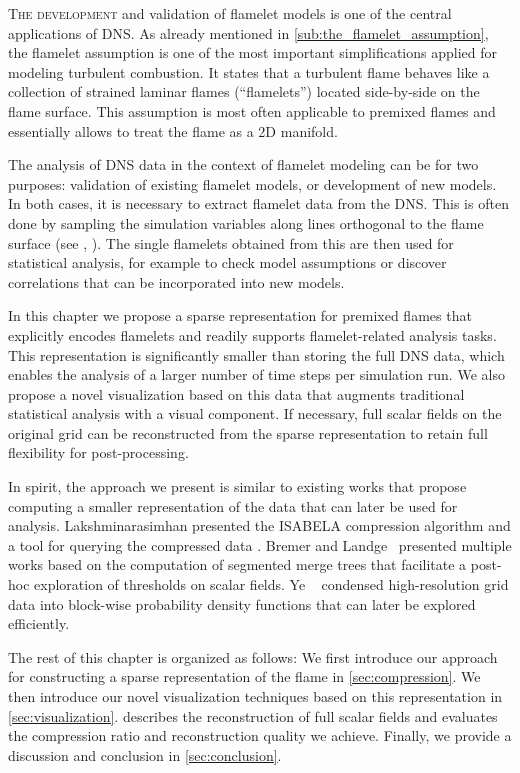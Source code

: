 \lettrine[lines=3, loversize=0.02, lhang=0.03, findent=-0.7pt,
nindent=0pt]{T}{he development} and validation of flamelet models is one of the
central applications of
\ac{DNS}.
%
As already mentioned in \cref{sub:the_flamelet_assumption}, the flamelet
assumption is one of the most important simplifications applied for modeling
turbulent combustion.
%
It states that a turbulent flame behaves like a collection of strained laminar
flames (``flamelets'') located side-by-side on the flame surface.
%
This assumption is most often applicable to premixed flames and essentially
allows to treat the flame as a \ac{2D} manifold.
%

%
The analysis of \ac{DNS} data in the context of flamelet modeling can be for
two purposes: validation of existing flamelet models, or development of new
models.
%
In both cases, it is necessary to extract flamelet data from the \ac{DNS}.
%
This is often done by sampling the simulation variables along lines orthogonal
to the flame surface (see \eg, \cite{Zistl2009}).
%
The single flamelets obtained from this are then used for statistical analysis,
for example to check model assumptions or discover correlations that can be
incorporated into new models.
%

%
In this chapter we propose a sparse representation for premixed flames that
explicitly encodes flamelets and readily supports flamelet-related analysis
tasks.
%
This representation is significantly smaller than storing the full DNS data,
which enables the analysis of a larger number of time steps per simulation run.
%
We also propose a novel visualization based on this data that augments
traditional statistical analysis with a visual component.
%
If necessary, full scalar fields on the original grid can be reconstructed
from the sparse representation to retain full flexibility for post-processing.
%

%
In spirit, the approach we present is similar to existing works that propose
computing a smaller representation of the data that can later be used for
analysis.
%
Lakshminarasimhan \etal presented the ISABELA compression algorithm
\cite{Lakshminarasimhan2011} and a tool for querying the compressed data
\cite{Lakshminarasimhan2011a}.
%
Bremer and Landge~\cite{Bremer2009,Bremer2011,Bremer2010,Landge2014} presented
multiple works based on the computation of segmented merge trees that facilitate
a post-hoc exploration of thresholds on scalar fields.
%
Ye \etal~\cite{Ye2016} condensed high-resolution grid data into block-wise
probability density functions that can later be explored efficiently.
%

%
The rest of this chapter is organized as follows:
%
We first introduce our approach for constructing a sparse representation of the
flame in \cref{sec:compression}.
%
We then introduce our novel visualization techniques based on this
representation in \cref{sec:visualization}.
%
 describes the reconstruction of full scalar fields and
evaluates the compression ratio and reconstruction quality we achieve.
%
Finally, we provide a discussion and conclusion in \cref{sec:conclusion}.
%